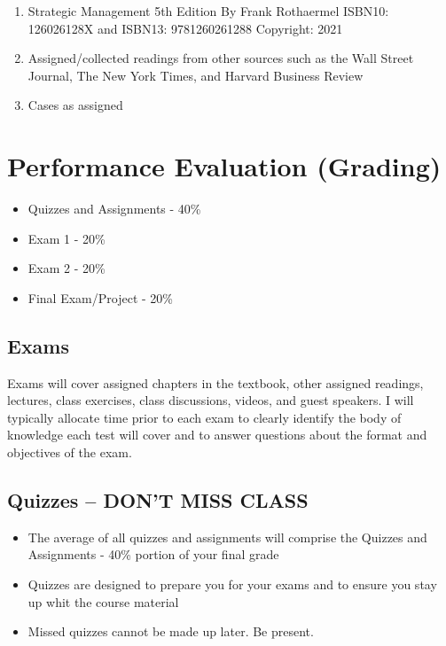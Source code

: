 \documentclass[
]{book}
\providecommand{\tightlist}{%
  \setlength{\itemsep}{0pt}\setlength{\parskip}{0pt}}
\begin{document}
\begin{enumerate}
\def\labelenumi{\arabic{enumi}.}
\tightlist
\item
  Strategic Management 5th Edition By Frank Rothaermel ISBN10: 126026128X and ISBN13: 9781260261288
  Copyright: 2021
\item
  Assigned/collected readings from other sources such as the Wall Street Journal, The New York Times, and Harvard Business Review
\item
  Cases as assigned
\end{enumerate}

\hypertarget{performance-evaluation-grading}{%
\section*{Performance Evaluation (Grading)}\label{performance-evaluation-grading}}

\begin{itemize}
\tightlist
\item
  Quizzes and Assignments - 40\%
\item
  Exam 1 - 20\%
\item
  Exam 2 - 20\%
\item
  Final Exam/Project - 20\%
\end{itemize}

\hypertarget{exams}{%
\subsection*{Exams}\label{exams}}

Exams will cover assigned chapters in the textbook, other assigned readings, lectures, class exercises, class discussions, videos, and guest speakers. I will typically allocate time prior to each exam to clearly identify the body of knowledge each test will cover and to answer questions about the format and objectives of the exam.

\hypertarget{quizzes-dont-miss-class}{%
\subsection*{\texorpdfstring{Quizzes -- \textbf{DON'T MISS CLASS}}{Quizzes -- DON'T MISS CLASS}}\label{quizzes-dont-miss-class}}

\begin{itemize}
\tightlist
\item
  The average of all quizzes and assignments will comprise the Quizzes and Assignments - 40\% portion of your final grade
\item
  Quizzes are designed to prepare you for your exams and to ensure you stay up whit the course material
\item
  Missed quizzes cannot be made up later. Be present.
\end{itemize}
\end{document}
